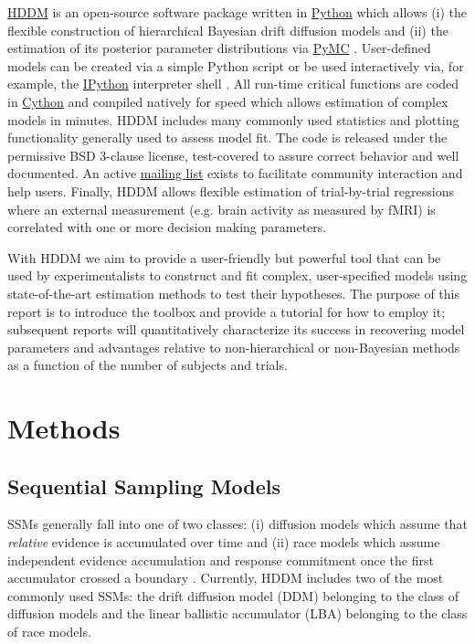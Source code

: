 \documentclass[letterpaper,10pt,english]{article}
\begin{document}
\href{http://github.com/twiecki/hddm}{HDDM} is an open-source software package written in \href{http://www.python.org/}{Python} which allows (i) the flexible construction of hierarchical Bayesian drift diffusion models and (ii) the estimation of its posterior parameter distributions via \href{http://code.google.com/p/pymc/}{PyMC} \citep{PatilHuardFonnesbeck10}. User-defined models can be created via a simple Python script or be used interactively via, for example, the \href{http://ipython.org}{IPython} interpreter shell \citep{PerezGranger07}. All run-time critical functions are coded in \href{http://www.cython.org/}{Cython} \citep{BehnelBradshawCitroEtAl11} and compiled natively for speed which allows estimation of complex models in minutes. HDDM includes many commonly used statistics and plotting functionality generally used to assess model fit. The code is released under the permissive BSD 3-clause license, test-covered to assure correct behavior and well documented. An active \href{https://groups.google.com/group/hddm-users/}{mailing list} exists to facilitate community interaction and help users. Finally, HDDM allows flexible estimation of trial-by-trial regressions where an external measurement (e.g. brain activity as measured by fMRI) is correlated with one or more decision making
parameters.

With HDDM we aim to provide a user-friendly but powerful tool that can
be used by experimentalists to construct and fit complex,
user-specified models using state-of-the-art estimation methods to
test their hypotheses. The purpose of this report is to introduce the
toolbox and provide a tutorial for how to employ it; subsequent
reports will quantitatively characterize its success in recovering
model parameters and advantages relative to non-hierarchical or
non-Bayesian methods as a function of the number of subjects and
trials.


\section*{Methods}
\label{methods:ipython}\label{methods:index-0}\label{methods::doc}\label{methods:methods}\label{methods:chap-methods}

\subsection*{Sequential Sampling Models}
\label{methods:sequential-sampling-models}
SSMs generally fall into one of two classes: (i) diffusion models
which assume that \emph{relative} evidence is accumulated over time
and (ii) race models which assume independent evidence accumulation
and response commitment once the first accumulator crossed a boundary
\citep{LaBerge62,Vickers70}. Currently, HDDM includes two of the most
commonly used SSMs: the drift diffusion model (DDM)
\citep{RatcliffRouder98,RatcliffMcKoon08} belonging to the
class of diffusion models and the linear ballistic accumulator (LBA)
\citep{BrownHeathcote08} belonging to the class of race models.
\end{document}

